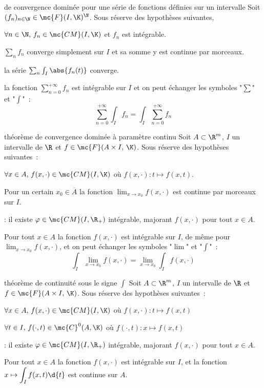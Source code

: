 \begin{adjustwidth}{-3cm}{-3cm}
\begin{theoreme}{12.59}{de convergence dominée pour une série de fonctions définies sur un intervalle}
    Soit $(f_n)_{n \in \N} \in \mc{F}(I,\K)^\N$. Sous réserve des hypothèses suivantes,
    \begin{enumeratebf}
        \item $\forall n \in \N,\, f_n \in \mc{CM}(I,\K)$ et $f_n$ est intégrable.
        \item $\sum_n f_n$ converge simplement sur $I$ et sa somme y est continue par morceaux.
        \item la série $\sum_n \int_I \abs{f_n(t)}$ converge.
    \end{enumeratebf}
    la fonction $\displaystyle\sum_{n=0}^{+\infty}f_n$ est intégrable sur $I$ et on peut échanger les symboles "$\sum$" et "$\int$"~:
    $$\sum_{n=0}^{+\infty} \int_I f_n = \int_I \sum_{n=0}^{+\infty} f_n$$
\end{theoreme}

\begin{theoreme}{12.61}{théorème de convergence dominée à paramètre continu}
    Soit $A \subset \R^m$, $I$ un intervalle de $\R$ et $f \in \mc{F}(A\times I,\, \K)$. Sous réserve des hypothèses suivantes~:
    \begin{enumeratebf}
        \item $\forall x \in A,\,  f(x,\cdot) \in \mc{CM}(I,\K)$ où $f(x,\cdot): t \mapsto f(x,t)$.
        \item Pour un certain $x_0 \in \overline{A}$ la fonction $\displaystyle \lim_{x \to x_0}f(x,\cdot)$ est continue par morceaux sur $I$.
        \item {} : il existe $\varphi \in \mc{CM}(I, \R_+)$ intégrable, majorant $f(x,\cdot)$ pour tout $x \in A$.
    \end{enumeratebf}
    Pour tout $x \in A$ la fonction $f(x, \cdot)$ est intégrable sur $I$, de même pour $\displaystyle \lim_{x \to x_0}f(x,\cdot)$, et on peut échanger les symboles "$\lim$" et "$\int$"~:
    $$\int_I \lim_{x \to x_0} f(x,\cdot) = \lim_{x \to x_0} \int_I f(x,\cdot)$$
\end{theoreme}

\begin{theoreme}{12.63}{théorème de continuité sous le signe $\int$}
    Soit $A \subset \R^m$, $I$ un intervalle de $\R$ et $f \in \mc{F}(A\times I,\, \K)$. Sous réserve des hypothèses suivantes~:
    \begin{enumeratebf}
        \item $\forall x \in A,\,  f(x,\cdot) \in \mc{CM}(I,\K)$ où $f(x,\cdot): t \mapsto f(x,t)$
        \item $\forall t \in I,\, f(\cdot, t) \in \mc{C}^0(A, \K)$ où $f(\cdot,t):x \mapsto f(x,t)$
        \item {} : il existe $\varphi \in \mc{CM}(I, \R_+)$ intégrable, majorant $f(x,\cdot)$ pour tout $x \in A$.
    \end{enumeratebf}
    Pour tout $x \in A$ la fonction $f(x, \cdot)$ est intégrable sur $I$, et la fonction $\displaystyle x \mapsto \int_I f(x,t)\d{t}$ est continue sur $A$.
\end{theoreme}


\end{adjustwidth}

